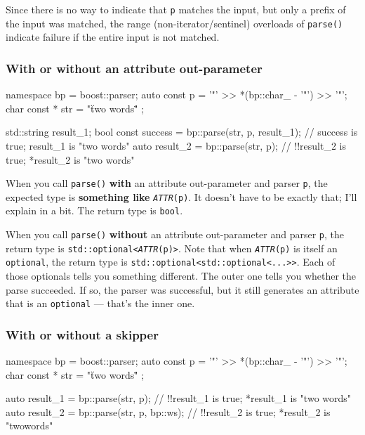 Since there is no way to indicate that \texttt{p} matches the input, but only a prefix of the input was matched, the range (non-iterator/sentinel) overloads of \texttt{parse()} indicate failure if the entire input is not matched.

\subsubsection{With or without an attribute out-parameter}

\begin{code}
namespace bp = boost::parser;
auto const p = '"' >> *(bp::char_ - '"') >> '"';
char const * str = "\"two words\"" ;

std::string result_1;
bool const success = bp::parse(str, p, result_1);   // success is true; result_1 is "two words"
auto result_2 = bp::parse(str, p);                  // !!result_2 is true; *result_2 is "two words"
\end{code}

When you call \texttt{parse()} \textbf{with} an attribute out-parameter and parser \texttt{p}, the expected type is \textbf{something like} \emph{\texttt{ATTR}}\texttt{(p)}. It doesn't have to be exactly that; I'll explain in a bit. The return type is \texttt{bool}.

When you call \texttt{parse()} \textbf{without} an attribute out-parameter and parser \texttt{p}, the return type is \texttt{std::optional<}\emph{\texttt{ATTR}}\texttt{(p)>}. Note that when \emph{\texttt{ATTR}}\texttt{(p)} is itself an \texttt{optional}, the return type is \texttt{std::optional<std::optional<...>>}. Each of those optionals tells you something different. The outer one tells you whether the parse succeeded. If so, the parser was successful, but it still generates an attribute that is an \texttt{optional} --- that's the inner one.

\subsubsection{With or without a skipper}

\begin{code}
namespace bp = boost::parser;
auto const p = '"' >> *(bp::char_ - '"') >> '"';
char const * str = "\"two words\"" ;

auto result_1 = bp::parse(str, p);         // !!result_1 is true; *result_1 is "two words"
auto result_2 = bp::parse(str, p, bp::ws); // !!result_2 is true; *result_2 is "twowords"
\end{code}


